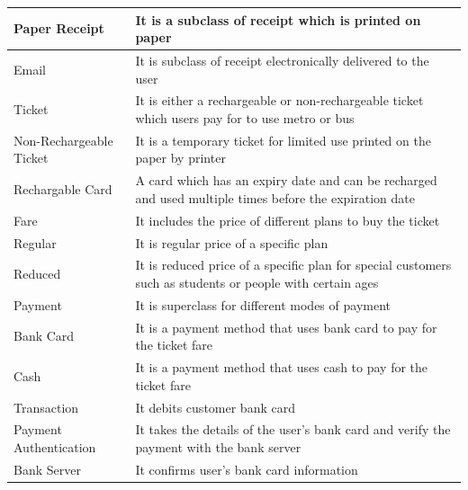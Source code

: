 \documentclass[a4paper,12pt]{report}
\begin{document}
\setlength{\tabcolsep}{18pt}
\renewcommand{\arraystretch}{1.5}
\begin{tabular}[H]{ |p{3cm}|p{12cm}| }
	\hline
	Paper Receipt & It is a subclass of receipt which is printed on paper
	\\
	\hline
	Email & It is subclass of receipt electronically delivered to the user
	\\
	\hline
	Ticket & It is either a rechargeable or non-rechargeable ticket which users pay for to use metro or bus
	\\
	\hline
	Non-Rechargeable Ticket & It is a temporary ticket for limited use printed on the paper by printer
	\\
	\hline
	Rechargable Card & A card which has an expiry date and can be recharged and used multiple times before the expiration date
	\\
	\hline
	Fare & It includes the price of different plans to buy the ticket
	\\
	\hline
	Regular & It is regular price of a specific plan
	\\
	\hline
	Reduced & It is reduced price of a specific plan for special customers such as students or people with certain ages
	\\
	\hline
	Payment & It is superclass for different modes of payment
	\\
	\hline
	Bank Card & It is a payment method that uses bank card to pay for the ticket fare
	\\
	\hline
	Cash & It is a payment method that uses cash to pay for the ticket fare
	\\
	\hline
	Transaction & It debits customer bank card  
	\\
	\hline
	Payment Authentication & It takes the details of the user’s bank card and verify the payment with the bank server
	\\
	\hline
	Bank Server & It confirms user’s bank card information
	\\
	\hline
\end{tabular}
\\ 


\newpage
\end{document}
